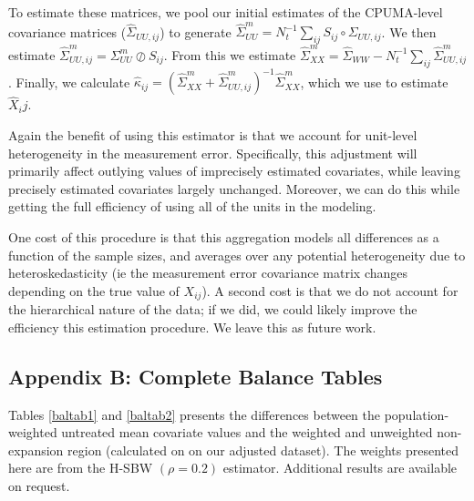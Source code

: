 \documentclass[12pt]{article}
\begin{document}
To estimate these matrices, we pool our initial estimates of the CPUMA-level covariance matrices ($\hat{\Sigma}_{UU, ij}$) to generate $\hat{\Sigma}_{UU}^m = N_t^{-1}\sum_{ij} S_{ij} \circ \Sigma_{UU, ij}$. We then estimate $\hat{\Sigma}_{UU, ij}^m = \Sigma_{UU}^m \oslash S_{ij}$. From this we estimate $\hat{\Sigma}^m_{XX} = \hat{\Sigma}_{WW} - N_t^{-1}\sum_{ij}\hat{\Sigma}^m_{UU, ij}$. Finally, we calculate $\hat{\kappa}_{ij} = (\hat{\Sigma}^m_{XX} + \hat{\Sigma}^m_{UU, ij})^{-1}\hat{\Sigma}^m_{XX}$, which we use to estimate $\hat{X}_ij$. 

Again the benefit of using this estimator is that we account for unit-level heterogeneity in the measurement error. Specifically, this adjustment will primarily affect outlying values of imprecisely estimated covariates, while leaving precisely estimated covariates largely unchanged. Moreover, we can do this while getting the full efficiency of using all of the units in the modeling. 

One cost of this procedure is that this aggregation models all differences as a function of the sample sizes, and averages over any potential heterogeneity due to heteroskedasticity (ie the measurement error covariance matrix changes depending on the true value of $X_{ij}$). A second cost is that we do not account for the hierarchical nature of the data; if we did, we could likely improve the efficiency this estimation procedure. We leave this as future work.

\subsection{Appendix B: Complete Balance Tables}

Tables \ref{baltab1} and \ref{baltab2} presents the differences between the population-weighted untreated mean covariate values and the weighted and unweighted non-expansion region (calculated on on our adjusted dataset). The weights presented here are from the H-SBW $(\rho = 0.2)$ estimator. Additional results are available on request.
\end{document}
